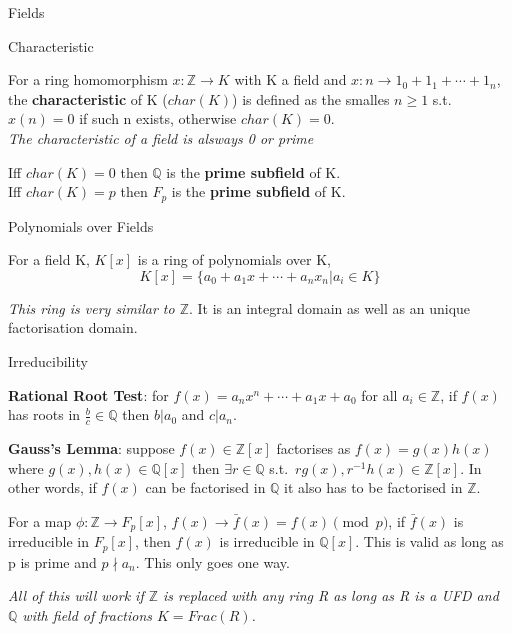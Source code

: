 \documentclass[12pt, letterpaper]{article}
\begin{document}
\begin{section}{Fields}

  \begin{subsection}{Characteristic}

    For a ring homomorphism \(x: \mathbb{Z} \to K\) with K a field and
    \(x: n \to 1_{0} + 1_{1} + \cdots + 1_{n}\), the  \textbf{characteristic}
    of K (\(char(K)\)) is defined as the smalles \(n \geq 1\) s.t. \(x(n) = 0\)
    if such n exists, otherwise \(char(K) = 0\). \\
    \textit{The characteristic of a field is alsways 0 or prime}

    Iff \(char(K) = 0\) then \(\mathbb{Q}\) is the \textbf{prime subfield} of
    K. \\
    Iff \(char(K) = p\) then \(F_{p}\) is the \textbf{prime subfield} of K.

  \end{subsection}

  \begin{subsection}{Polynomials over Fields}

    For a field K, \(K[x]\) is a ring of polynomials over K,
    \[K[x] = \{a_{0} + a_{1}x + \cdots + a_{n}x_{n} | a_{i} \in K\}{}\]

    \textit{This ring is very similar to \(\mathbb{Z}\)}. It is an integral
    domain as well as an unique factorisation domain.

    \begin{subsubsection}{Irreducibility}

      \textbf{Rational Root Test}: for \(f(x) = a_{n}x^{n} + \cdots + a_{1}x
      + a_{0}\) for all \(a_{i} \in \mathbb{Z}\), if \(f(x)\) has roots in
      \(\frac{b}{c} \in \mathbb{Q}\) then \(b | a_{0}\) and \(c | a_{n}\).

      \textbf{Gauss's Lemma}: suppose \(f(x) \in \mathbb{Z}[x]\) factorises as
      \(f(x) = g(x)h(x)\) where \(g(x), h(x) \in \mathbb{Q}[x]\) then \(\exists r
      \in \mathbb{Q}\) s.t.\ \(rg(x), r^{-1}h(x) \in \mathbb{Z}[x]\). In other
      words, if \(f(x)\) can be factorised in \(\mathbb{Q}\) it also has to be
      factorised in \(\mathbb{Z}\).

      For a map \(\phi: \mathbb{Z} \to F_{p}[x]\), \(f(x) \to \bar{f}(x) =
      f(x) \pmod{p}\), if \(\bar{f}(x)\) is irreducible in \(F_{p}[x]\), then
      \(f(x)\) is irreducible in \(\mathbb{Q}[x]\). This is valid as long as
      p is prime and \(p \nmid a_{n}\). This only goes one way.

      \textit{All of this will work if \(\mathbb{Z}\) is replaced with any ring
        R as long as R is a UFD and \(\mathbb{Q}\) with field of fractions
        \(K = Frac(R)\).}


\end{subsubsection}
\end{subsection}
\end{section}
\end{document}
